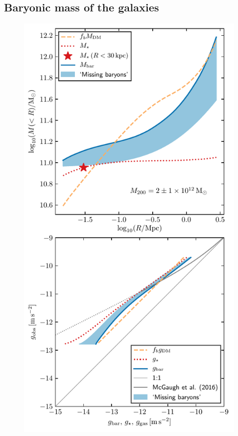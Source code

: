 \documentclass[usenatbib]{mnras}
\begin{document}
\subsection{Baryonic mass of the galaxies}
\label{sec:baryonic_mass}

\begin{figure}
	\includegraphics[width=\columnwidth]{Figures/missing_baryons.pdf}

\end{figure}
\end{document}
